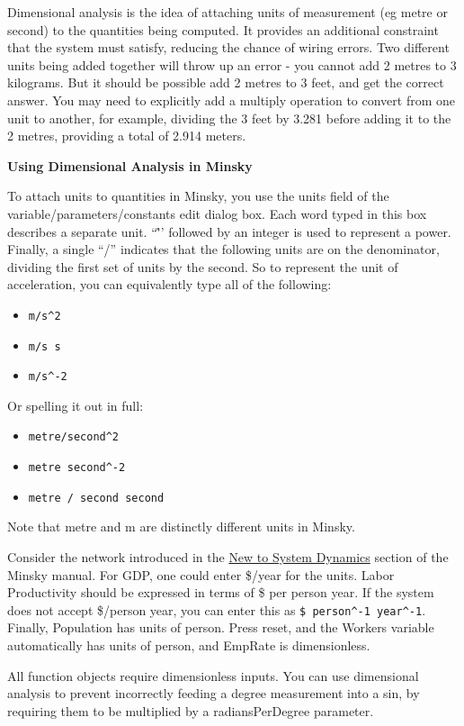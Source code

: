 Dimensional analysis is the idea of attaching units of measurement
(eg metre or second) to the quantities being computed. It provides an 
additional constraint that the system must satisfy, reducing the chance 
of wiring errors. Two different units being added together will throw up 
an error - you cannot add 2 metres to 3 kilograms. But it should be 
possible add 2 metres to 3 feet, and get the correct answer. You may need 
to explicitly add a multiply operation to convert from one unit to another,
for example, dividing the 3 feet by 3.281 before adding it to the 2 metres,
providing a total of 2.914 meters.

\textbf{Using Dimensional Analysis in Minsky}

To attach units to quantities in Minsky, you use the units field of the 
variable/parameters/constants edit dialog box. Each word typed in this box 
describes a separate unit. ``\^'' followed by an integer is used to 
represent a power. Finally, a single ``/'' indicates that the following units 
are on the denominator, dividing the first set of units by the second. So 
to represent the unit of acceleration, you can equivalently type all of the following:

\begin{itemize}
  \item \verb+m/s^2+
  \item \verb+m/s s+
  \item \verb+m/s^-2+
\end{itemize}

Or spelling it out in full:

\begin{itemize}
  \item \verb+metre/second^2+
  \item \verb+metre second^-2+
  \item \verb+metre / second second+
\end{itemize}

Note that metre and m are distinctly different units in Minsky.

Consider the network introduced in the \hyperref[intro:new]{New to System Dynamics}
section of the Minsky manual. For GDP, one could enter \$/year for the units. Labor 
Productivity should be expressed in terms of \$ per person year. If the system
does not accept \$/person year, you can enter this as \verb+$ person^-1 year^-1+. 
Finally, Population has units of person. Press reset, and the Workers variable 
automatically has units of person, and EmpRate is dimensionless.

All function objects require dimensionless inputs. You can use dimensional 
analysis to prevent incorrectly feeding a degree measurement into a sin, by 
requiring them to be multiplied by a radiansPerDegree parameter.
